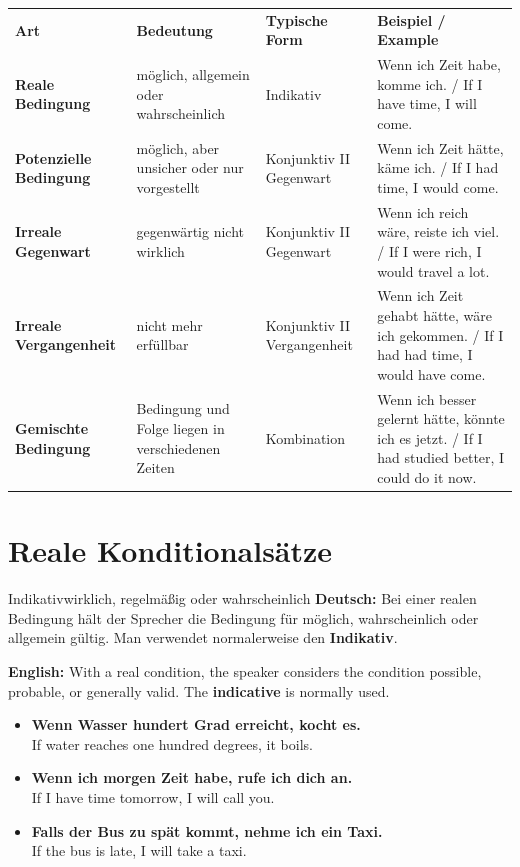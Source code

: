 \documentclass[a4paper,11pt]{article}
\newcommand{\GermanText}[1]{\textbf{Deutsch: }#1\par}
\newcommand{\EnglishText}[1]{{\small\color{SoftGray}\textbf{English: }#1\par}}
\newcommand{\ExampleItem}[2]{\item \textbf{#1}\\{\small\color{SoftGray}#2}}
\begin{document}
        \begin{longtable}{>{\bfseries}p{2.8cm}|p{3.2cm}|p{3.8cm}|p{4.2cm}}
            \rowcolor{HeaderBlueDark}
            \color{white}\textbf{Art} &
            \color{white}\textbf{Bedeutung} &
            \color{white}\textbf{Typische Form} &
            \color{white}\textbf{Beispiel / Example} \\
            Reale Bedingung & möglich, allgemein oder wahrscheinlich & Indikativ & Wenn ich Zeit habe, komme ich. / If I have time, I will come. \\
            Potenzielle Bedingung & möglich, aber unsicher oder nur vorgestellt & Konjunktiv II Gegenwart & Wenn ich Zeit hätte, käme ich. / If I had time, I would come. \\
            Irreale Gegenwart & gegenwärtig nicht wirklich & Konjunktiv II Gegenwart & Wenn ich reich wäre, reiste ich viel. / If I were rich, I would travel a lot. \\
            Irreale Vergangenheit & nicht mehr erfüllbar & Konjunktiv II Vergangenheit & Wenn ich Zeit gehabt hätte, wäre ich gekommen. / If I had had time, I would have come. \\
            Gemischte Bedingung & Bedingung und Folge liegen in verschiedenen Zeiten & Kombination & Wenn ich besser gelernt hätte, könnte ich es jetzt. / If I had studied better, I could do it now. \\
        \end{longtable}

    \section{Reale Konditionalsätze}

        \begin{grammarentry}{Indikativ}{wirklich, regelmäßig oder wahrscheinlich}
            \GermanText{Bei einer realen Bedingung hält der Sprecher die Bedingung für möglich, wahrscheinlich oder allgemein gültig. Man verwendet normalerweise den \textbf{Indikativ}.}
            \EnglishText{With a real condition, the speaker considers the condition possible, probable, or generally valid. The \textbf{indicative} is normally used.}
        \end{grammarentry}

        \begin{exbox}
            \begin{itemize}
                \ExampleItem{Wenn Wasser hundert Grad erreicht, kocht es.}{If water reaches one hundred degrees, it boils.}
                \ExampleItem{Wenn ich morgen Zeit habe, rufe ich dich an.}{If I have time tomorrow, I will call you.}
                \ExampleItem{Falls der Bus zu spät kommt, nehme ich ein Taxi.}{If the bus is late, I will take a taxi.}
            \end{itemize}
        \end{exbox}
\end{document}
